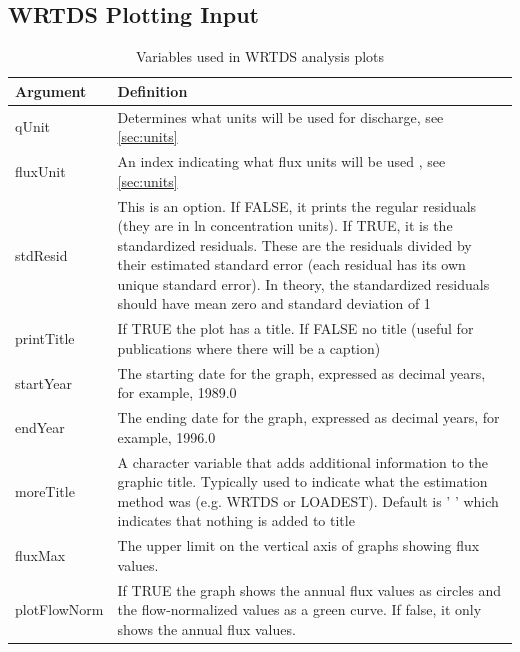 \documentclass[a4paper,11pt]{article}
\begin{document}
\FloatBarrier
\clearpage

\subsection{WRTDS Plotting Input}
\label{sec:wrtdsOutputVariables}

\begin{table}[ht]
\caption{Variables used in WRTDS analysis plots  \label{tab:wrtdsVariables}}
\begin{tabularx}{\textwidth}{lX}
\hline
  \textbf{Argument} & \textbf{Definition} \\
\hline
qUnit & Determines what units will be used for discharge, see \ref{sec:units}\\
fluxUnit & An index indicating what flux units will be used , see \ref{sec:units}\\
stdResid & This is an option.  If FALSE, it prints the regular residuals (they are in ln concentration units).  If TRUE, it is the standardized residuals.  These are the residuals divided by their estimated standard error (each residual has its own unique standard error).  In theory, the standardized residuals should have mean zero and standard deviation of 1 \\
printTitle & If TRUE the plot has a title.  If FALSE no title (useful for publications where there will be a caption) \\
startYear & The starting date for the graph, expressed as decimal years, for example, 1989.0 \\
endYear & The ending date for the graph, expressed as decimal years, for example, 1996.0 \\
moreTitle & A character variable that adds additional information to the graphic title.  Typically used to indicate what the estimation method was (e.g. WRTDS or LOADEST).  Default is ' ' which indicates that nothing is added to title \\
fluxMax & The upper limit on the vertical axis of graphs showing flux values.  \\
plotFlowNorm & If TRUE the graph shows the annual flux values as circles and the flow-normalized values as a green curve.  If false, it only shows the annual flux values.\\
\hline
\end{tabularx}

\end{table}
\end{document}
